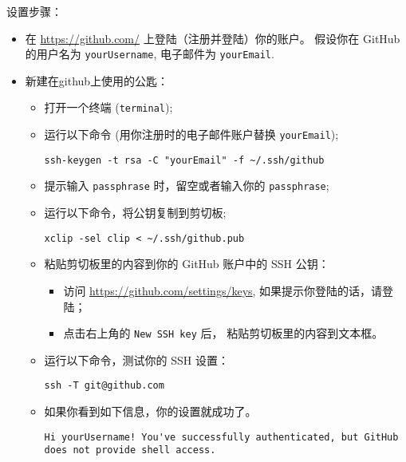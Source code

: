 \documentclass[
    11pt,
    base=hide,
    cite=authoryear,
    device=phone,
    lang=cn,
    mode=simple,
    result=answer,
    toc=onecol,
]{elegantbook_sierxue}
\begin{document}
设置步骤：
\begin{itemize}
    \item 在 \href{https://github.com/}{https://github.com/}
        上登陆（注册并登陆）你的账户。
        假设你在 GitHub 的用户名为 \lstinline{yourUsername},
        电子邮件为 \lstinline{yourEmail}.
    \item 新建在github上使用的公匙：
        \begin{itemize}
            \item 打开一个终端 (\lstinline{terminal});
            \item 运行以下命令 (用你注册时的电子邮件账户替换
                \lstinline{yourEmail});
\begin{lstlisting}[style=lst-right]
ssh-keygen -t rsa -C "yourEmail" -f ~/.ssh/github
\end{lstlisting}
            \item 提示输入 \lstinline{passphrase}
                时，留空或者输入你的 \lstinline{passphrase};
            \item 运行以下命令，将公钥复制到剪切板;
\begin{lstlisting}[style=lst-right]
xclip -sel clip < ~/.ssh/github.pub
\end{lstlisting}
            \item 粘贴剪切板里的内容到你的 GitHub 账户中的 SSH 公钥：
                \begin{itemize}
                    \item 访问 \href{https://github.com/settings/keys}
                        {https://github.com/settings/keys},
                        如果提示你登陆的话，请登陆；
                    \item 点击右上角的 \lstinline{New SSH key} 后，
                        粘贴剪切板里的内容到文本框。
                \end{itemize}
            \item 运行以下命令，测试你的 SSH 设置：
\begin{lstlisting}[style=lst-right]
ssh -T git@github.com
\end{lstlisting}
            \item 如果你看到如下信息，你的设置就成功了。
\begin{lstlisting}[style=lst-right]
Hi yourUsername! You've successfully authenticated, but GitHub does not provide shell access.
\end{lstlisting}
        \end{itemize}
\end{itemize}
\end{document}

